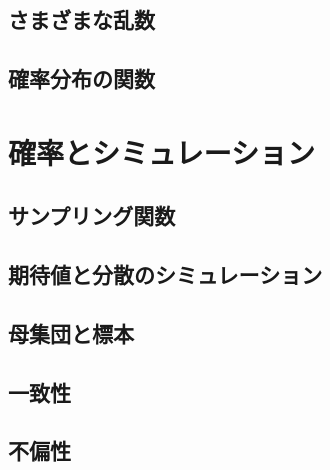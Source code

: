\documentclass[
  a4paper,
]{ltjsbook}
\begin{document}
\hypertarget{ux3055ux307eux3056ux307eux306aux4e71ux6570}{%
\section{さまざまな乱数}\label{ux3055ux307eux3056ux307eux306aux4e71ux6570}}

\hypertarget{ux78baux7387ux5206ux5e03ux306eux95a2ux6570}{%
\section{確率分布の関数}\label{ux78baux7387ux5206ux5e03ux306eux95a2ux6570}}


\hypertarget{ux78baux7387ux3068ux30b7ux30dfux30e5ux30ecux30fcux30b7ux30e7ux30f3}{%
\chapter{確率とシミュレーション}\label{ux78baux7387ux3068ux30b7ux30dfux30e5ux30ecux30fcux30b7ux30e7ux30f3}}

\hypertarget{ux30b5ux30f3ux30d7ux30eaux30f3ux30b0ux95a2ux6570}{%
\section{サンプリング関数}\label{ux30b5ux30f3ux30d7ux30eaux30f3ux30b0ux95a2ux6570}}

\hypertarget{ux671fux5f85ux5024ux3068ux5206ux6563ux306eux30b7ux30dfux30e5ux30ecux30fcux30b7ux30e7ux30f3}{%
\section{期待値と分散のシミュレーション}\label{ux671fux5f85ux5024ux3068ux5206ux6563ux306eux30b7ux30dfux30e5ux30ecux30fcux30b7ux30e7ux30f3}}

\hypertarget{ux6bcdux96c6ux56e3ux3068ux6a19ux672c}{%
\section{母集団と標本}\label{ux6bcdux96c6ux56e3ux3068ux6a19ux672c}}

\hypertarget{ux4e00ux81f4ux6027}{%
\section{一致性}\label{ux4e00ux81f4ux6027}}

\hypertarget{ux4e0dux504fux6027}{%
\section{不偏性}\label{ux4e0dux504fux6027}}
\end{document}

